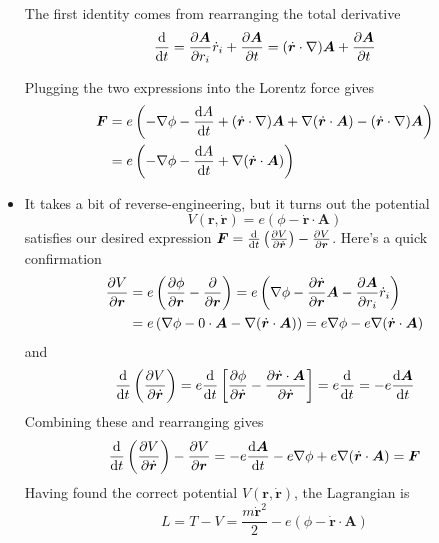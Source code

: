 \documentclass[11pt, a4paper]{article}
\newcommand{\bdot}[1]{\dot{\bm{#1}}}
\renewcommand{\grad}{\nabla }
\begin{document}
\begin{itemize}
	The first identity comes from rearranging the total derivative 
	\begin{equation*}
		\dv{}{t} (\bm{A}(\bm{r}, t)) = \pdv{\bm{A}}{r_{i}}\dot{r}_{i} + \pdv{\bm{A}}{t} = (\bdot{r} \cdot \grad) \bm{A} + \pdv{\bm{A}}{t}
	\end{equation*}
	
	Plugging the two expressions into the Lorentz force gives
	\begin{align*}
		\bm{F} &= e\left(-\grad \phi - \dv{A}{t} + (\bdot{r} \cdot \grad)\bm{A} +  \grad(\bdot{r}\cdot\bm{A}) - (\bdot{r} \cdot \grad )\bm{A} \right)\\
		&= e\left(-\grad \phi - \dv{A}{t} +  \grad(\bdot{r}\cdot\bm{A})\right)
	\end{align*}
	
	\item It takes a bit of reverse-engineering, but it turns out the potential 
	\begin{equation*}
		V(\bm{r}, \bdot{r}) = e(\phi - \bdot{r} \cdot \bm{A} )
	\end{equation*}
	satisfies our desired expression $ \bm{F} = \dv{}{t}\left(\pdv{V}{\bdot{r}}\right) - \pdv{V}{\bm{r}}  $. Here's a quick confirmation
	\begin{align*}
		\pdv{V}{\bm{r}} &= e\left(\pdv{\phi}{\bm{r}} - \pdv{}{\bm{r}} (\bdot{r} \cdot \bm{A}) \right) = e \left(\grad \phi - \pdv{\bdot{r}}{\bm{r}}\bm{A} - \pdv{\bm{A}}{r_{i}}\dot{r}_{i} \right) \\
		&= e\left(\grad \phi - 0\cdot \bm{A} - \grad(\bdot{r}\cdot\bm{A})\right) =  e \grad \phi - e \grad(\bdot{r}\cdot\bm{A})
	\end{align*}
	and 
	\begin{equation*}
		\dv{}{t}\left(\pdv{V}{\bdot{r}}\right) = e\dv{}{t}\left[\pdv{\phi}{\bdot{r}} - \pdv{\bdot{r}\cdot \bm{A}}{\bdot{r}}\right] = e \dv{}{t} (0 - \bm{A}) = -e \dv{\bm{A}}{t}
	\end{equation*}
	Combining these and rearranging gives
	\begin{equation*}
		 \dv{}{t}\left(\pdv{V}{\bdot{r}}\right) - \pdv{V}{\bm{r}}  = -e \dv{\bm{A}}{t} - e \grad \phi + e \grad(\bdot{r}\cdot\bm{A}) = \bm{F}
	\end{equation*}
	Having found the correct potential $ V(\bm{r}, \bdot{r})$, the Lagrangian is
	\begin{equation*}
		L = T - V = \frac{m\bdot{r}^{2}}{2} - e(\phi - \bdot{r} \cdot \bm{A} )
	\end{equation*}
\end{itemize}
\end{document}
